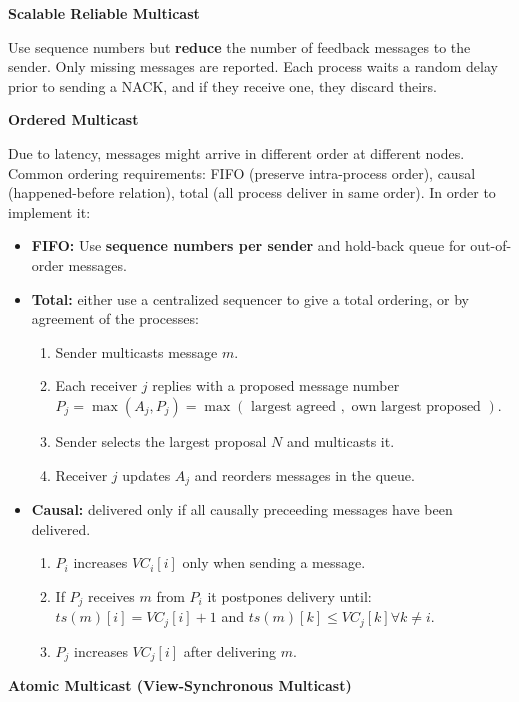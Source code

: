 \documentclass[a4paper, 10pt, twocolumn]{article}
\begin{document}
    \textbf{Scalable Reliable Multicast}

    Use sequence numbers but \textbf{reduce} the number of feedback messages to the sender.
    Only missing messages are reported.
    Each process waits a random delay prior to sending a NACK, and if they receive one, they discard theirs.

    \textbf{Ordered Multicast}

    Due to latency, messages might arrive in different order at different nodes.
    Common ordering requirements: FIFO (preserve intra-process order), causal (happened-before relation), total (all process deliver in same order).
    In order to implement it:
    \begin{itemize}
        \item \textbf{FIFO:} Use \textbf{sequence numbers per sender} and hold-back queue for out-of-order messages.
        \item \textbf{Total:} either use a centralized sequencer to give a total ordering, or by agreement of the processes:
        \begin{enumerate}
            \item Sender multicasts message $m$.
            \item Each receiver $j$ replies with a proposed message number $P_j = \max(A_j, P_j) = \max(\text{ largest agreed }, \text{ own largest proposed })$.
            \item Sender selects the largest proposal $N$ and multicasts it.
            \item Receiver $j$ updates $A_j$ and reorders messages in the queue.
        \end{enumerate}
        \item \textbf{Causal:} delivered only if all causally preceeding messages have been delivered.
        \begin{enumerate}
            \item $P_i$ increases $VC_i[i]$ only when sending a message.
            \item If $P_j$ receives $m$ from $P_i$ it postpones delivery until: $ts(m)[i] = VC_j[i] + 1$ and $ts(m)[k] \leq VC_j[k] \forall k \neq i$.
            \item $P_j$ increases $VC_j[i]$ after delivering $m$.
        \end{enumerate}
    \end{itemize}

    \textbf{Atomic Multicast (View-Synchronous Multicast)}
\end{document}
